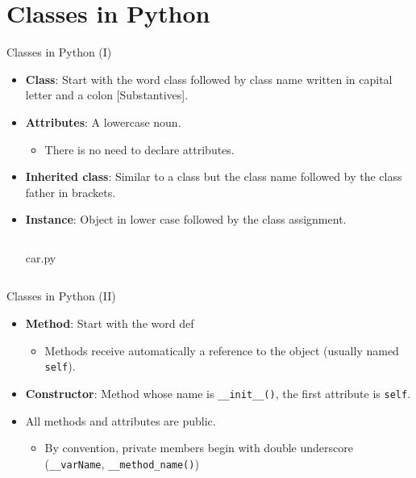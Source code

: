\documentclass[10pt,compress]{beamer} %
\begin{document}
\section{Classes in Python}

\begin{frame}{Classes in Python (I)}
\vspace{-0.2cm}
\begin{itemize}			
		\item \small{\textbf{Class}: Start with the word \alert{class} followed by class name written in \alert{capital letter} and a colon [Substantives].}
		\item \small{\textbf{Attributes}: A lowercase noun.}
		\begin{itemize}
		\item \footnotesize{There is no need to declare attributes.}
		\end{itemize}
		
		\item \small{\textbf{Inherited class}: Similar to a class but the class name followed by the class father in brackets.}
		\item \small{\textbf{Instance}: Object in lower case followed by the class assignment.}
			\vspace{-0.2cm} 
  	   \begin{columns}
			\begin{block}{\small{car.py}}
			\vspace{-0.3cm} 
				\vspace{-0.2cm} 
			\end{block}
	\end{columns}		
\end{itemize}			
\end{frame}

\begin{frame}{Classes in Python (II)}
\begin{itemize}
	\item \textbf{Method}: Start with the word \alert{def}
   \begin{itemize}
   \item Methods receive automatically a reference to the object (usually named \texttt{self}).
   \end{itemize}
		\item \textbf{Constructor}: Method whose name is \texttt{\_\_init\_\_()}, the first attribute is \texttt{self}.

		\item All methods and attributes are public.
			\begin{itemize}
				\item By convention, private members begin with double underscore (\texttt{\_\_varName}, \texttt{\_\_method\_name()})
			\end{itemize}
\end{itemize}			
\end{frame}
\end{document}
